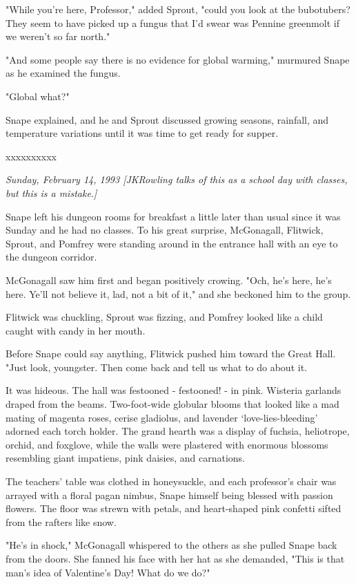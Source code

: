 \documentclass[a4paper,11pt]{article}
\begin{document}
"While you're here, Professor," added Sprout, "could you look at the bubotubers? They seem to have picked up a fungus that I'd swear was Pennine greenmolt if we weren't so far north."

"And some people say there is no evidence for global warming," murmured Snape as he examined the fungus.

"Global what?"

Snape explained, and he and Sprout discussed growing seasons, rainfall, and temperature variations until it was time to get ready for supper.

xxxxxxxxxx

\emph{Sunday, February 14, 1993 [JKRowling talks of this as a school day with classes, but this is a mistake.]}

Snape left his dungeon rooms for breakfast a little later than usual since it was Sunday and he had no classes. To his great surprise, McGonagall, Flitwick, Sprout, and Pomfrey were standing around in the entrance hall with an eye to the dungeon corridor.

McGonagall saw him first and began positively crowing. "Och, he's here, he's here. Ye'll not believe it, lad, not a bit of it," and she beckoned him to the group.

Flitwick was chuckling, Sprout was fizzing, and Pomfrey looked like a child caught with candy in her mouth.

Before Snape could say anything, Flitwick pushed him toward the Great Hall. "Just look, youngster. Then come back and tell us what to do about it.

It was hideous. The hall was festooned - festooned! - in pink. Wisteria garlands draped from the beams. Two-foot-wide globular blooms that looked like a mad mating of magenta roses, cerise gladiolus, and lavender `love-lies-bleeding' adorned each torch holder. The grand hearth was a display of fuchsia, heliotrope, orchid, and foxglove, while the walls were plastered with enormous blossoms resembling giant impatiens, pink daisies, and carnations.

The teachers' table was clothed in honeysuckle, and each professor's chair was arrayed with a floral pagan nimbus, Snape himself being blessed with passion flowers. The floor was strewn with petals, and heart-shaped pink confetti sifted from the rafters like snow.

"He's in shock," McGonagall whispered to the others as she pulled Snape back from the doors. She fanned his face with her hat as she demanded, "This is that man's idea of Valentine's Day! What do we do?"
\end{document}
